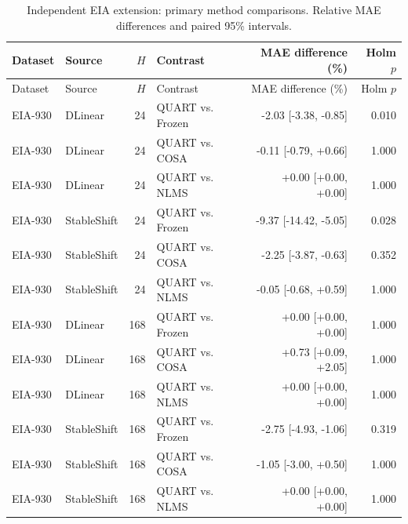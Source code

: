 \begin{longtable}{llrlrr}
\caption{Independent EIA extension: primary method comparisons. Relative MAE differences and paired 95\% intervals.}\label{tab:independent_main}\\
\toprule
Dataset & Source & $H$ & Contrast & MAE difference (\%) & Holm $p$\\
\midrule
\endfirsthead
\toprule
Dataset & Source & $H$ & Contrast & MAE difference (\%) & Holm $p$\\
\midrule
\endhead
EIA-930 & DLinear & 24 & QUART vs. Frozen & -2.03 [-3.38, -0.85] & 0.010\\
EIA-930 & DLinear & 24 & QUART vs. COSA & -0.11 [-0.79, +0.66] & 1.000\\
EIA-930 & DLinear & 24 & QUART vs. NLMS & +0.00 [+0.00, +0.00] & 1.000\\
EIA-930 & StableShift & 24 & QUART vs. Frozen & -9.37 [-14.42, -5.05] & 0.028\\
EIA-930 & StableShift & 24 & QUART vs. COSA & -2.25 [-3.87, -0.63] & 0.352\\
EIA-930 & StableShift & 24 & QUART vs. NLMS & -0.05 [-0.68, +0.59] & 1.000\\
EIA-930 & DLinear & 168 & QUART vs. Frozen & +0.00 [+0.00, +0.00] & 1.000\\
EIA-930 & DLinear & 168 & QUART vs. COSA & +0.73 [+0.09, +2.05] & 1.000\\
EIA-930 & DLinear & 168 & QUART vs. NLMS & +0.00 [+0.00, +0.00] & 1.000\\
EIA-930 & StableShift & 168 & QUART vs. Frozen & -2.75 [-4.93, -1.06] & 0.319\\
EIA-930 & StableShift & 168 & QUART vs. COSA & -1.05 [-3.00, +0.50] & 1.000\\
EIA-930 & StableShift & 168 & QUART vs. NLMS & +0.00 [+0.00, +0.00] & 1.000\\
\bottomrule
\end{longtable}